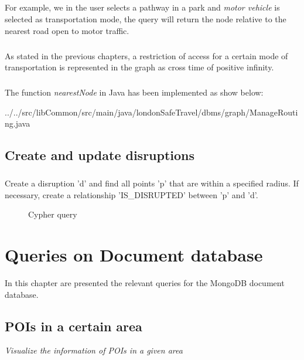\paragraph{}
For example, we in the user selects a pathway in a park and \textit{motor vehicle} is selected as transportation mode, the query will return the node relative to the nearest road open to motor traffic.

\paragraph{}
As stated in the previous chapters, a restriction of access for a certain mode of transportation is represented in the graph as cross time of positive infinity.

\paragraph{}
The function \textit{nearestNode} in Java has been implemented as show below:

{../../src/libCommon/src/main/java/londonSafeTravel/dbms/graph/ManageRouting.java}

\section{Create and update disruptions}
\paragraph{}
Create a disruption 'd' and find all points 'p' that are within a specified radius. If necessary, create a relationship 'IS\_DISRUPTED' between 'p' and 'd'.
\begin{figure}[H]
	
	\caption{Cypher query}
\end{figure}

\chapter{Queries on Document database}
In this chapter are presented the relevant queries for the
MongoDB document database.

\section{POIs in a certain area}
\textit{Visualize the information of POIs in a given area}

